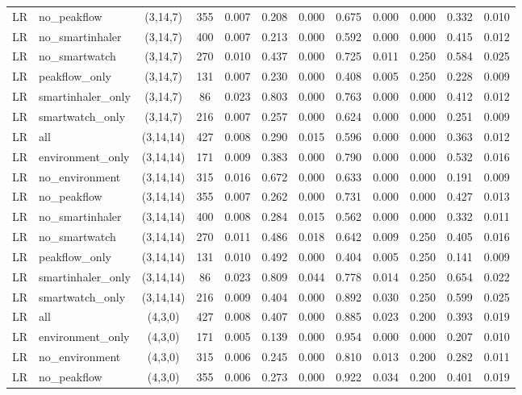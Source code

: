 \begin{longtable}{llcccccccccc}
LR & no\_peakflow & (3,14,7) & 355 & 0.007 & 0.208 & 0.000 & 0.675 & 0.000 & 0.000 & 0.332 & 0.010 \\
LR & no\_smartinhaler & (3,14,7) & 400 & 0.007 & 0.213 & 0.000 & 0.592 & 0.000 & 0.000 & 0.415 & 0.012 \\
LR & no\_smartwatch & (3,14,7) & 270 & 0.010 & 0.437 & 0.000 & 0.725 & 0.011 & 0.250 & 0.584 & 0.025 \\
LR & peakflow\_only & (3,14,7) & 131 & 0.007 & 0.230 & 0.000 & 0.408 & 0.005 & 0.250 & 0.228 & 0.009 \\
LR & smartinhaler\_only & (3,14,7) & 86 & 0.023 & 0.803 & 0.000 & 0.763 & 0.000 & 0.000 & 0.412 & 0.012 \\
LR & smartwatch\_only & (3,14,7) & 216 & 0.007 & 0.257 & 0.000 & 0.624 & 0.000 & 0.000 & 0.251 & 0.009 \\
LR & all & (3,14,14) & 427 & 0.008 & 0.290 & 0.015 & 0.596 & 0.000 & 0.000 & 0.363 & 0.012 \\
LR & environment\_only & (3,14,14) & 171 & 0.009 & 0.383 & 0.000 & 0.790 & 0.000 & 0.000 & 0.532 & 0.016 \\
LR & no\_environment & (3,14,14) & 315 & 0.016 & 0.672 & 0.000 & 0.633 & 0.000 & 0.000 & 0.191 & 0.009 \\
LR & no\_peakflow & (3,14,14) & 355 & 0.007 & 0.262 & 0.000 & 0.731 & 0.000 & 0.000 & 0.427 & 0.013 \\
LR & no\_smartinhaler & (3,14,14) & 400 & 0.008 & 0.284 & 0.015 & 0.562 & 0.000 & 0.000 & 0.332 & 0.011 \\
LR & no\_smartwatch & (3,14,14) & 270 & 0.011 & 0.486 & 0.018 & 0.642 & 0.009 & 0.250 & 0.405 & 0.016 \\
LR & peakflow\_only & (3,14,14) & 131 & 0.010 & 0.492 & 0.000 & 0.404 & 0.005 & 0.250 & 0.141 & 0.009 \\
LR & smartinhaler\_only & (3,14,14) & 86 & 0.023 & 0.809 & 0.044 & 0.778 & 0.014 & 0.250 & 0.654 & 0.022 \\
LR & smartwatch\_only & (3,14,14) & 216 & 0.009 & 0.404 & 0.000 & 0.892 & 0.030 & 0.250 & 0.599 & 0.025 \\
LR & all & (4,3,0) & 427 & 0.008 & 0.407 & 0.000 & 0.885 & 0.023 & 0.200 & 0.393 & 0.019 \\
LR & environment\_only & (4,3,0) & 171 & 0.005 & 0.139 & 0.000 & 0.954 & 0.000 & 0.000 & 0.207 & 0.010 \\
LR & no\_environment & (4,3,0) & 315 & 0.006 & 0.245 & 0.000 & 0.810 & 0.013 & 0.200 & 0.282 & 0.011 \\
LR & no\_peakflow & (4,3,0) & 355 & 0.006 & 0.273 & 0.000 & 0.922 & 0.034 & 0.200 & 0.401 & 0.019 \\

\end{longtable}

